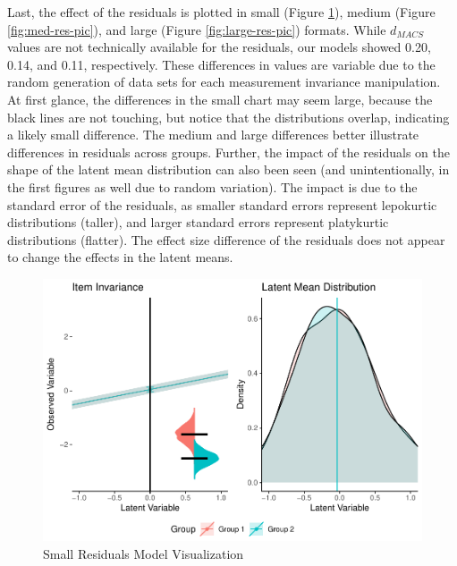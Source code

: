\documentclass[
  man]{apa7}
\begin{document}
Last, the effect of the residuals is plotted in small (Figure \ref{fig:small-res-pic}), medium (Figure \ref{fig:med-res-pic}), and large (Figure \ref{fig:large-res-pic}) formats. While \(d_{MACS}\) values are not technically available for the residuals, our models showed 0.20, 0.14, and 0.11, respectively. These differences in values are variable due to the random generation of data sets for each measurement invariance manipulation. At first glance, the differences in the small chart may seem large, because the black lines are not touching, but notice that the distributions overlap, indicating a likely small difference. The medium and large differences better illustrate differences in residuals across groups. Further, the impact of the residuals on the shape of the latent mean distribution can also been seen (and unintentionally, in the first figures as well due to random variation). The impact is due to the standard error of the residuals, as smaller standard errors represent lepokurtic distributions (taller), and larger standard errors represent platykurtic distributions (flatter). The effect size difference of the residuals does not appear to change the effects in the latent means.

\begin{figure}
\centering
\includegraphics{manuscript_files/figure-latex/small-res-pic-1.pdf}
\caption{\label{fig:small-res-pic}Small Residuals Model Visualization}
\end{figure}
\end{document}
